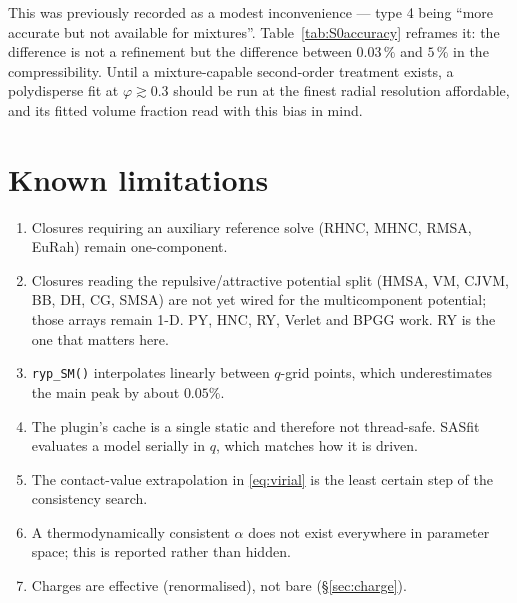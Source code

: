 \documentclass[11pt,a4paper]{article}
\newcommand{\code}[1]{\texttt{\hspace{0pt}#1}}
\begin{document}
This was previously recorded as a modest inconvenience --- type 4 being
``more accurate but not available for mixtures''. Table~\ref{tab:S0accuracy}
reframes it: the difference is not a refinement but the difference between
$0.03\,\%$ and $5\,\%$ in the compressibility. Until a mixture-capable
second-order treatment exists, a polydisperse fit at $\varphi \gtrsim 0.3$
should be run at the finest radial resolution affordable, and its fitted
volume fraction read with this bias in mind.

\section{Known limitations}

\begin{enumerate}[nosep]
\item Closures requiring an auxiliary reference solve (RHNC, MHNC, RMSA,
      EuRah) remain one-component.
\item Closures reading the repulsive/attractive potential split (HMSA, VM,
      CJVM, BB, DH, CG, SMSA) are not yet wired for the multicomponent
      potential; those arrays remain 1-D. PY, HNC, RY, Verlet and BPGG work.
      RY is the one that matters here.
\item \code{ryp\_SM()} interpolates linearly between $q$-grid points, which
      underestimates the main peak by about $0.05\%$.
\item The plugin's cache is a single static and therefore not thread-safe.
      SASfit evaluates a model serially in $q$, which matches how it is
      driven.
\item The contact-value extrapolation in \eqref{eq:virial} is the least
      certain step of the consistency search.
\item A thermodynamically consistent $\alpha$ does not exist everywhere in
      parameter space; this is reported rather than hidden.
\item Charges are effective (renormalised), not bare (\S\ref{sec:charge}).
\end{enumerate}

\end{document}
